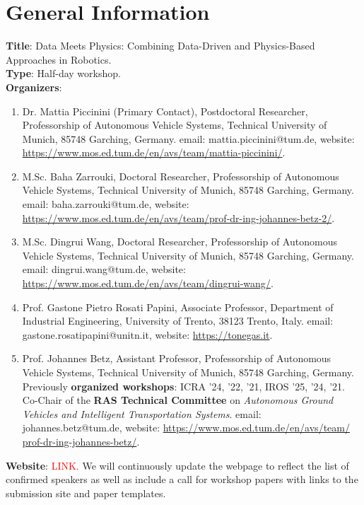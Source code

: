 \documentclass[12pt,a4paper]{article}
\newcommand{\revM}[1]{\textcolor{Red}{#1}}
\begin{document}
\section{General Information} \label{sec_info}
%
\noindent \textbf{Title}: Data Meets Physics: Combining Data-Driven and Physics-Based Approaches in Robotics.\\
%
\textbf{Type}: Half-day workshop.\\
%
\textbf{Organizers}:
%
\begin{enumerate}
	\item Dr. Mattia Piccinini (Primary Contact), Postdoctoral Researcher, Professorship of Autonomous Vehicle Systems, Technical University of Munich, 85748 Garching, Germany. email: mattia.piccinini@tum.de, website: \href{https://www.mos.ed.tum.de/en/avs/team/mattia-piccinini/}{https://www.mos.ed.tum.de/en/avs/team/mattia-piccinini/}.
	\item M.Sc. Baha Zarrouki, Doctoral Researcher, Professorship of Autonomous Vehicle Systems, Technical University of Munich, 85748 Garching, Germany. email: baha.zarrouki@tum.de, website:\\\href{https://www.mos.ed.tum.de/en/avs/team/prof-dr-ing-johannes-betz-2/}{https://www.mos.ed.tum.de/en/avs/team/prof-dr-ing-johannes-betz-2/}.
    \item M.Sc. Dingrui Wang, Doctoral Researcher, Professorship of Autonomous Vehicle Systems, Technical University of Munich, 85748 Garching, Germany. email: dingrui.wang@tum.de, website:\\\href{https://www.mos.ed.tum.de/en/avs/team/dingrui-wang/}{https://www.mos.ed.tum.de/en/avs/team/dingrui-wang/}.
	\item Prof. Gastone Pietro Rosati Papini, Associate Professor, Department of Industrial Engineering, University of Trento, 38123 Trento, Italy. email: gastone.rosatipapini@unitn.it, website: \href{https://tonegas.it}{https://tonegas.it}.
	\item Prof. Johannes Betz, Assistant Professor, Professorship of Autonomous Vehicle Systems, Technical University of Munich, 85748 Garching, Germany. Previously \textbf{organized workshops}: ICRA '24, '22, '21, IROS '25, '24, '21. Co-Chair of the \textbf{RAS Technical Committee} on \textit{Autonomous Ground Vehicles and Intelligent Transportation Systems}. email: johannes.betz@tum.de, website: \href{https://www.mos.ed.tum.de/en/avs/team/prof-dr-ing-johannes-betz/}{https://www.mos.ed.tum.de/en/avs/team/\\prof-dr-ing-johannes-betz/}.
\end{enumerate}
%
\textbf{Website}: \revM{LINK.} We will continuously update the webpage to reflect the list of confirmed speakers as well as
include a call for workshop papers with links to the submission site and paper templates.
%
\end{document}
